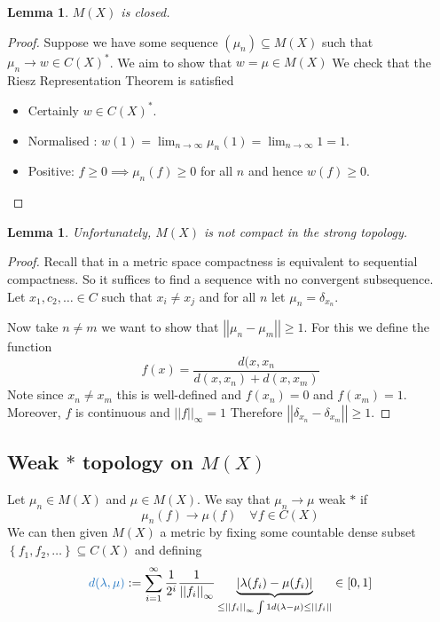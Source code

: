 \documentclass[11pt]{article}
\newcommand{\defeq}{:=}
\newcommand{\abs}[1]{\left|#1\right|}
\newcommand{\norm}[1]{\left|\left|#1\right|\right|}
\newenvironment{defin}
	{\begin{mdframed}[backgroundcolor=white, roundcorner=5pt, linewidth=1pt, linecolor=RoyalBlue]}
	{\end{mdframed}}
\newcommand{\mdf}[1]{{\color{RoyalBlue} #1}}
\newtheorem{lemma}[prop]{Lemma}
\begin{document}
\begin{lemma}
$M(X)$ is closed.
\end{lemma}

\begin{proof}
Suppose we have some sequence $(\mu_n)\subseteq M(X)$ such that $\mu_n\to w\in C(X)^\ast$.
We aim to show that $w=\mu\in M(X)$
We check that the Riesz Representation Theorem is satisfied
\begin{itemize}
	\item Certainly $w\in C(X)^\ast$.
	\item Normalised : $w(1)=\lim_{n\to\infty}\mu_n(1) = \lim_{n\to\infty}1=1$.
	\item Positive: $f\geq 0 \implies \mu_n(f)\geq 0$ for all $n$ and hence $w(f)\geq 0$.
\end{itemize}
\end{proof}

\begin{lemma}
Unfortunately, $M(X)$ is not compact in the strong topology.
\end{lemma}
\begin{proof}
Recall that in a metric space compactness is equivalent to sequential compactness.
So it suffices to find a sequence with no convergent subsequence.
Let $x_1, c_2, \dots \in C$ such that $x_i\neq x_j$ and for all $n$ let $\mu_n=\delta_{x_n}$.

Now take $n\neq m$ we want to show that $\norm{\mu_n - \mu_m} \geq 1$.
For this we define the function 
\[
	f(x)=\frac{d(x, x_n}{d(x, x_n) + d(x, x_m)}
\]
Note since $x_n\neq x_m$ this is well-defined and $f(x_n)=0$ and $f(x_m)=1$.
Moreover, $f$ is continuous and $\norm{f}_\infty = 1$
Therefore $\norm{\delta_{x_n}-\delta_{x_m}}\geq 1$.
\end{proof}

\subsection{Weak $\ast$ topology on $M(X)$}
\begin{defin}
	Let $\mu_n\in M(X)$ and $\mu\in M(X)$.
	We say that $\mu_n\to\mu$ \mdf{weak $\ast$} if
	\[
		\mu_n(f)\to\mu(f) \quad \forall f\in C(X)
	\]
	We can then given $M(X)$ a metric by fixing some countable dense subset $\left\{ f_1, f_2, \dots \right\}\subseteq C(X)$ and defining
	\[
		\mdf{d(\lambda, \mu)}\defeq \sum_{i=1}^{\infty}\frac{1}{2^i}\frac{1}{\norm{f_i}_\infty}\underbrace{\abs{\lambda(f_i)-\mu(f_i)}}_{\leq\norm{f_i}_\infty \int 1 d(\lambda - \mu) \leq \norm{f_i}}\in [0, 1]
	\]
\end{defin}
\end{document}
